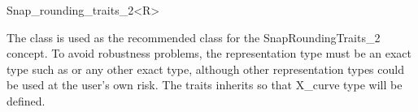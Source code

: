
\ccRefPageBegin


\begin {ccRefClass} {Snap_rounding_traits_2<R>}
    
    The class 
    is used as the recommended class for the SnapRoundingTraits_2 concept.
    To avoid robustness problems, 
    the representation type  must be an exact type such as
     or any other exact type,
    although other representation types could be used at the user's own risk.
    The traits inherits  so that
    X_curve type will be defined.

 
\ccIsModel
    \\
 
\end{ccRefClass} %
\ccRefPageEnd
